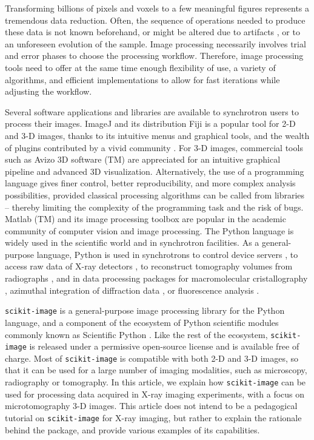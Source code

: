 \documentclass[twocolumn]{bmcart}%
\begin{document}
Transforming billions of pixels and voxels to a few meaningful figures
represents a tremendous data reduction. Often, the sequence of operations
needed to produce these data is not known beforehand, or might be altered
due to artifacts \citep{Marone2010}, or to an unforeseen evolution of
the sample. Image processing necessarily involves trial and error phases
to choose the processing workflow. Therefore, image processing tools need
to offer at the same time enough flexibility of use, a variety of
algorithms, and efficient implementations to allow for fast iterations
while adjusting the workflow.

Several software applications and libraries are available to synchrotron
users to process their images. ImageJ \citep{Abramoff2004, Schneider2012}
and its distribution Fiji \citep{Schindelin2012} is a popular tool for
2-D and 3-D images, thanks to its intuitive menus and graphical tools,
and the wealth of plugins contributed by a vivid community
\citep{Schindelin2015}. For 3-D images, commercial tools such as Avizo 3D
software (TM) are appreciated for an intuitive graphical pipeline and
advanced 3D visualization. Alternatively, the use of a programming
language gives finer control, better reproducibility, and more complex analysis
possibilities, provided classical processing algorithms can be called
from libraries -- thereby limiting the complexity of the programming task
and the risk of bugs. Matlab (TM) and its image processing toolbox are
popular in the academic community of computer vision and image
processing. The Python language is widely used in the scientific world
and in synchrotron facilities. As a general-purpose language, Python is
used in synchrotrons to control device servers \citep{pytango}, to access
raw data of X-ray detectors \citep{Knudsen2013}, to reconstruct
tomography volumes from radiographs \citep{Gursoy2014, Mirone2014}, and
in data processing packages for macromolecular cristallography
\citep{Adams2010}, azimuthal integration of diffraction data
\citep{Ashiotis2015}, or fluorescence analysis \citep{pymca}.

\texttt{scikit-image} \citep{Vanderwalt2014} is a general-purpose image
processing library for the Python language, and a component of the ecosystem of
Python scientific modules commonly known as Scientific
Python \citep{Oliphant2007}. Like the rest of the ecosystem,
\texttt{scikit-image} is released under a permissive open-source license and is
available free of charge. Most of \texttt{scikit-image} is compatible with both 2-D and
3-D images, so that it can be used for a large number of imaging modalities,
such as microscopy, radiography or tomography. In this article, we explain how
\texttt{scikit-image} can be used for processing data acquired in X-ray
imaging experiments, with a focus on microtomography 3-D images. This
article does not intend to be a pedagogical tutorial on \texttt{scikit-image}
for X-ray imaging, but rather to explain the rationale behind the package, and
provide various examples of its capabilities.
\end{document}
